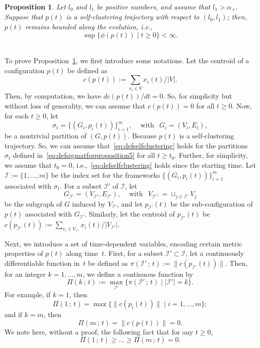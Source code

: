 \documentclass[10pt,twocolumn,twoside]{IEEEtran}
\newtheorem{pro}{Proposition}
\renewcommand{\cal}{\mathcal}
\renewcommand{\(}{\left (}
\renewcommand{\)}{\right )}
\renewcommand{\;}{\,;\,}
\begin{document}
\begin{pro}\label{pro:selfclustering}
Let $l_0$ and $l_1$ be positive numbers, and assume that $l_1 > \alpha_+$. Suppose that $p(t)$ is a self-clustering trajectory with respect to $(l_0, l_1)$; then, $p(t)$ remains bounded along the evolution, i.e., 
$$
\sup\{\phi(p(t)) \mid t \ge 0\} < \infty.
$$ \,   
\end{pro}

To prove Proposition~\ref{pro:selfclustering}, we first introduce some notations. 
Let the centroid of a configuration $p(t)$ be defined as 
$$
c(p(t)) := \sum_{v_i \in V} x_i(t)/ |V|.  
$$ 
Then, by computation, we have $d c(p(t))/dt = 0$. So, for simplicity but without loss of generality, we can assume that 
$c(p(t)) = 0$  for all $t\ge 0$. 
Now, for each $t\ge 0$, let 
\begin{equation}\label{eq:defsigmatforproposition5}
\sigma_t = \{(G_i, p_i(t))\}^m_{i = 1}, \hspace{10pt} \mbox{ with } \hspace{5pt} G_i = (V_i, E_i), 
\end{equation}  
be a nontrivial partition of $(G, p(t))$. Because $p(t)$ is a self-clustering trajectory. So, we can assume that~\eqref{eq:defselfclustering} holds for the partitions $\sigma_t$ defined in~\eqref{eq:defsigmatforproposition5} for all $t \ge t_0$. Further, for simplicity, we assume that $t_0 = 0$, i.e.,~\eqref{eq:defselfclustering} holds since the starting time.   
Let $\cal{I} := \{1,\ldots, m\}$ be the index set for the frameworks $\{(G_i,p_i(t))\}^m_{i=1}$ associated with $\sigma_t$. For a subset $\cal{I}'$ of $\cal{I}$, let $$G_{\cal{I}'} = (V_{\cal{I}'}, E_{\cal{I}'}), \hspace{10pt} \mbox{ with } \hspace{5pt} V_{\cal{I}'}: =\sqcup_{j\in \cal{I}'} V_j $$  
be the subgraph of $G$ induced by $V_{\cal{I}'}$, and let  
$
p_{\cal{I}'}(t)  
$ 
be the sub-configuration of $p(t)$ associated with $G_{\cal{I}'}$. Similarly, let the centroid of $p_{\cal{I}'}(t)$ be 
$c(p_{\cal{I}'}(t)) := \sum_{v_{i}\in V_{\cal{I}'}} x_i(t) /|V_{\cal{I}'}|$.  


Next, we introduce a set of time-dependent variables, encoding certain metric properties of $p(t)$ along time~$t$.  
First, for a subset $\cal{I}'\subset\cal{I}$, let a continuously differentiable function in~$t$ be defined as 
$
\pi(\cal{I}'\; t):= \| c(p_{\cal{I}'}(t)) \|
$. 
Then, for an integer $k = 1,\ldots, m$,  we define a continuous function by 
\begin{equation}\label{eq:defPIkt}
\Pi(k\; t) := \max_{\cal{I}'}\{\pi(\cal{I}'\; t) \mid  |\cal{I}'| = k\}. 
\end{equation}
For example, if $k = 1$, then
\begin{equation*}\label{eq:Pi1thehe}
\Pi(1\; t) = \max\{\|c(p_i(t))\|  \mid i = 1,\ldots, m\}; 
\end{equation*}
and if $k = m$, then   
$$
\Pi(m\; t) = \|c(p(t))\| = 0.
$$
We  note here, without a proof,  the following fact that for any $t\ge 0$,  
\begin{equation*}\label{eq:1:30pm}
\Pi(1\; t) \ge \ldots \ge \Pi(m\; t) = 0.
\end{equation*}
\end{document}
